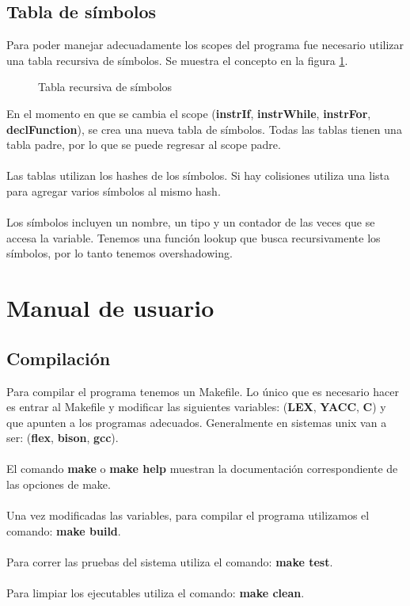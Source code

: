 \documentclass[11pt]{article}
\begin{document}
\subsection{Tabla de símbolos}

Para poder manejar adecuadamente los scopes del programa fue necesario utilizar una tabla recursiva de símbolos. Se muestra el 
concepto en la figura \ref{fig:symtabrec}.

\begin{figure}[H]
    \centering
    \caption{Tabla recursiva de símbolos}
    \label{fig:symtabrec}
\end{figure}

En el momento en que se cambia el scope (\textbf{instrIf}, \textbf{instrWhile}, \textbf{instrFor}, \textbf{declFunction}), se 
crea una nueva tabla de símbolos. Todas las tablas tienen una tabla padre, por lo que se puede regresar al scope padre.
\\\\
Las tablas utilizan los hashes de los símbolos. Si hay colisiones utiliza una lista para agregar varios símbolos al mismo hash.
\\\\
Los símbolos incluyen un nombre, un tipo y un contador de las veces que se accesa la variable. Tenemos una función lookup que 
busca recursivamente los símbolos, por lo tanto tenemos overshadowing.

\section{Manual de usuario}

\subsection{Compilación}

Para compilar el programa tenemos un Makefile. Lo único que es necesario hacer es entrar al Makefile y modificar las siguientes 
variables: (\textbf{LEX}, \textbf{YACC}, \textbf{C}) y que apunten a los programas adecuados. Generalmente en sistemas unix van 
a ser: (\textbf{flex}, \textbf{bison}, \textbf{gcc}).
\\\\
El comando \textbf{make} o \textbf{make help} muestran la documentación correspondiente de las opciones de make.
\\\\
Una vez modificadas las variables, para compilar el programa utilizamos el comando: \textbf{make build}.
\\\\
Para correr las pruebas del sistema utiliza el comando: \textbf{make test}.
\\\\
Para limpiar los ejecutables utiliza el comando: \textbf{make clean}.
\end{document}
